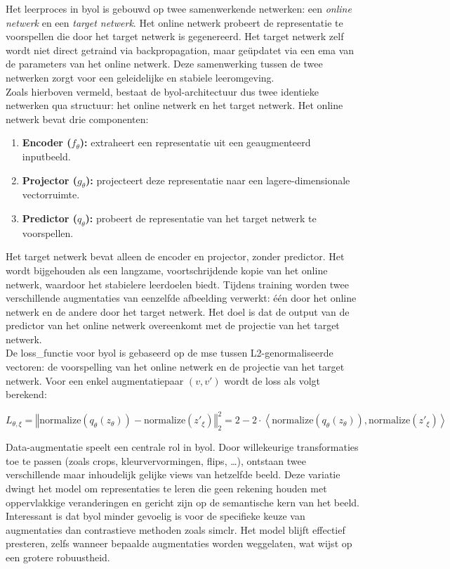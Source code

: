 Het leerproces in \gls{byol} is gebouwd op twee samenwerkende netwerken: een \emph{online netwerk} en een \emph{target netwerk}. Het online netwerk probeert de representatie te voorspellen die door het target netwerk is gegenereerd. Het target netwerk zelf wordt niet direct getraind via \gls{backpropagation}, maar geüpdatet via een \gls{ema} van de parameters van het online netwerk. Deze samenwerking tussen de twee netwerken zorgt voor een geleidelijke en stabiele leeromgeving. \\

Zoals hierboven vermeld, bestaat de \gls{byol}-architectuur dus twee identieke netwerken qua structuur: het online netwerk en het target netwerk. Het online netwerk bevat drie componenten:

\begin{enumerate}
    \item \textbf{Encoder ($f_\theta$):} extraheert een representatie uit een geaugmenteerd inputbeeld.
    \item \textbf{Projector ($g_\theta$):} projecteert deze representatie naar een lagere-dimensionale vectorruimte.
    \item \textbf{Predictor ($q_\theta$):} probeert de representatie van het target netwerk te voorspellen.
\end{enumerate}

Het target netwerk bevat alleen de encoder en projector, zonder predictor. Het wordt bijgehouden als een langzame, voortschrijdende kopie van het online netwerk, waardoor het stabielere leerdoelen biedt. Tijdens training worden twee verschillende augmentaties van eenzelfde afbeelding verwerkt: één door het online netwerk en de andere door het target netwerk. Het doel is dat de output van de predictor van het online netwerk overeenkomt met de projectie van het target netwerk. \\

De \gls{loss_functie} voor \gls{byol} is gebaseerd op de \gls{mse} tussen L2-genormaliseerde vectoren: de voorspelling van het online netwerk en de projectie van het target netwerk. \autocite{Laarhoven_2017} Voor een enkel augmentatiepaar $(v, v')$ wordt de loss als volgt berekend:

$$
L_{\theta, \xi} = \left\Vert \text{normalize}\left(q_\theta\left(z_\theta\right)\right) - \text{normalize}\left(z'_\xi\right) \right\Vert^2_2 = 2 - 2 \cdot \left\langle \text{normalize}\left(q_\theta\left(z_\theta\right)\right), \text{normalize}\left(z'_\xi\right) \right\rangle
$$

Data-augmentatie speelt een centrale rol in \gls{byol}. Door willekeurige transformaties toe te passen (zoals crops, kleurvervormingen, flips, \dots), ontstaan twee verschillende maar inhoudelijk gelijke views van hetzelfde beeld. Deze variatie dwingt het model om representaties te leren die geen rekening houden met oppervlakkige veranderingen en gericht zijn op de semantische kern van het beeld. Interessant is dat \gls{byol} minder gevoelig is voor de specifieke keuze van augmentaties dan contrastieve methoden zoals \gls{simclr}. Het model blijft effectief presteren, zelfs wanneer bepaalde augmentaties worden weggelaten, wat wijst op een grotere robuustheid.